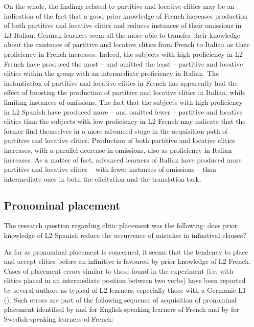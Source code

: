 \documentclass[output=paper,modfonts,nonflat,newtxmath]{langsci/langscibook}
\begin{document}
On the whole, the findings related to partitive and locative clitics may be an indication of the fact that a good prior knowledge of French increases production of both partitive and locative clitics and reduces instances of their omissions in L3 Italian. German learners seem all the more able to transfer their knowledge about the existence of partitive and locative clitics from French to Italian as their proficiency in French increases. Indeed, the subjects with high proficiency in L2 French have produced the most – and omitted the least – partitive and locative clitics within the group with an intermediate proficiency in Italian. The instantiation of partitive and locative clitics in French has apparently had the effect of boosting the production of partitive and locative clitics in Italian, while limiting instances of omissions. The fact that the subjects with high proficiency in L2 Spanish have produced more – and omitted fewer – partitive and locative clitics than the subjects with low proficiency in L2 French may indicate that the former find themselves in a more advanced stage in the acquisition path of partitive and locative clitics. Production of both partitive and locative clitics increases, with a parallel decrease in omissions, also as proficiency in Italian increases. As a matter of fact, advanced learners of Italian have produced more partitive and locative clitics – with fewer instances of omissions – than intermediate ones in both the elicitation and the translation task.

\subsection{Pronominal placement} %
\label{sec:sciutti:5.2}

The research question regarding clitic placement was the following: does prior knowledge of L2 Spanish reduce the occurrence of mistakes in infinitival clauses?

As far as pronominal placement is concerned, it seems that the tendency to place and accept clitics before an infinitive is favoured by prior knowledge of L2 French. Cases of placement errors similar to those found in the experiment (i.e. with clitics placed in an intermediate position between two verbs) have been reported by several authors as typical of L2 learners, especially those with a Germanic L1 (\citealt{GundelTarone1983, ConnorsNuckle1986, Zobl1992, TowellHawkins1994, GrondinWhite1996,  HulkMuller2000, Herschensohn2004, Ferrari2006, Maffei2009, Corino2012}). Such errors are part of the following sequence of acquisition of pronominal placement identified by \citet{TowellHawkins1994} and \citet{Herschensohn2004} for English-speaking learners of French and by \citet{Schlyter1997} for Swedish-speaking learners of French:
\end{document}
